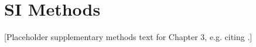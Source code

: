 \section{SI Methods}
[Placeholder supplementary methods text for Chapter 3, e.g. citing \cite{Placeholder2021}.]
